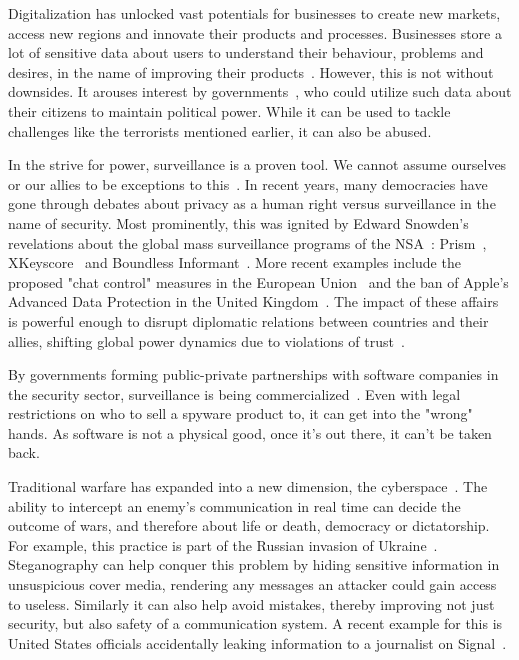 Digitalization has unlocked vast potentials for businesses to create new markets, access new regions and innovate their products and processes. Businesses store a lot of sensitive data about users to understand their behaviour, problems and desires, in the name of improving their products~\cite{duportailAskedTinderMy2017,titcombMillionsPeoplesDNA2025}. However, this is not without downsides. It arouses interest by governments~\cite{greenwaldNSAPrismProgram2013}, who could utilize such data about their citizens to maintain political power. While it can be used to tackle challenges like the terrorists mentioned earlier, it can also be abused.

In the strive for power, surveillance is a proven tool. We cannot assume ourselves or our allies to be exceptions to this~\cite{macaskillGCHQTapsFibreoptic2013}. In recent years, many democracies have gone through debates about privacy as a human right versus surveillance in the name of security. Most prominently, this was ignited by Edward Snowden's revelations about the global mass surveillance programs of the \gls{NSA}~\cite{greenwaldEdwardSnowdenWhistleblower2013}: Prism~\cite{greenwaldNSAPrismProgram2013}, XKeyscore~\cite{greenwaldXKeyscoreNSATool2013} and Boundless Informant~\cite{greenwaldBoundlessInformantNSAs2013}. More recent examples include the proposed "chat control" measures in the European Union~\cite{danielChatControlEnd2024} and the ban of Apple's Advanced Data Protection in the United Kingdom~\cite{kleinmanUKGovernmentDemands2025,kleinmanApplePullsData2025}. The impact of these affairs is powerful enough to disrupt diplomatic relations between countries and their allies, shifting global power dynamics due to violations of trust~\cite{traynorMerkelComparedNSA2013}.

By governments forming public-private partnerships with software companies in the security sector, surveillance is being commercialized~\cite{bbcPegasusSpywareSold2021,kasterPrivatizedEspionageNSO2023}. Even with legal restrictions on who to sell a spyware product to, it can get into the "wrong" hands. As software is not a physical good, once it's out there, it can't be taken back.

Traditional warfare has expanded into a new dimension, the cyberspace~\cite{serpanosCyberwarfareUkraine2022}. The ability to intercept an enemy's communication in real time can decide the outcome of wars, and therefore about life or death, democracy or dictatorship. For example, this practice is part of the Russian invasion of Ukraine~\cite{sufiSocialMediaAnalytics2023}. Steganography can help conquer this problem by hiding sensitive information in unsuspicious cover media, rendering any messages an attacker could gain access to useless. Similarly it can also help avoid mistakes, thereby improving not just security, but also safety of a communication system. A recent example for this is United States officials accidentally leaking information to a journalist on Signal~\cite{goldbergTrumpAdministrationAccidentally2025,goldbergHereAreAttack2025}.

